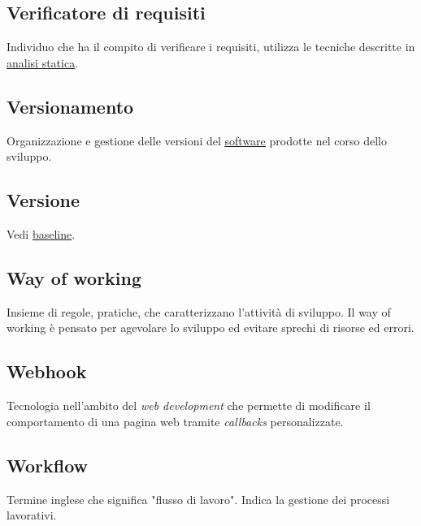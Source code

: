 	\subsection{Verificatore di requisiti}
	\label{sec:verificatorerequisiti}
	Individuo che ha il compito di verificare i requisiti, utilizza le tecniche descritte in \underline{\hyperref[sec:analisistatica]{analisi statica}}.

	
	\subsection{Versionamento}
	\label{sec:versionamento}
	Organizzazione e gestione delle versioni del \underline{\hyperref[sec:prodottosoftware]{software}} prodotte nel corso dello sviluppo.

	
	\subsection{Versione}
	\label{sec:versione}
	Vedi \underline{\hyperref[sec:baseline]{baseline}}.
	
	
	\newpage
	
	
	\subsection{Way of working}
	\label{sec:wow}
	Insieme di regole, pratiche, che caratterizzano l'attività di sviluppo. Il way of working è pensato per agevolare lo sviluppo ed evitare sprechi di risorse ed errori.

	
	\subsection{Webhook}
	\label{sec:webhook}
	Tecnologia nell'ambito del \emph{web development} che permette di modificare il comportamento di una pagina web tramite \emph{callbacks} personalizzate.


	\subsection{Workflow}
	\label{sec:workflow}
	Termine inglese che significa "flusso di lavoro". Indica la gestione dei processi lavorativi.

	 
	\newpage


